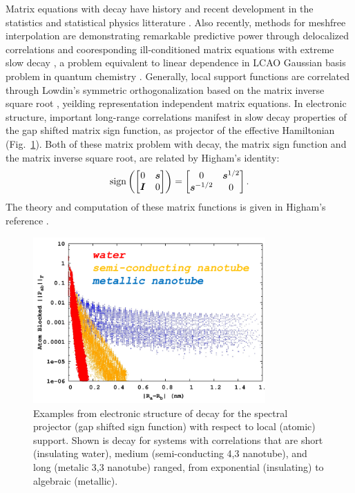 \documentclass[letterpaper,twocolumn,amsmath,amsfont,amssymb,english,aps,jcp,preprintnumbers,groupaddress,nofootinbib,tightenlines,floatfix]{revtex4}
\newcommand{\mat}[1]{\boldsymbol{#1}}
\theoremstyle{plain}
\theoremstyle{remark}
\theoremstyle{plain}
\begin{document}
Matrix equations with decay have history and recent development in the statistics and statistical physics litterature
\cite{penrose1974,voit00, Anselin2003, Hardin2013, Krishtal2014}.   Also recently, methods for meshfree interpolation 
are demonstrating remarkable predictive power through delocalized correlations and cooresponding 
ill-conditioned matrix equations with extreme slow decay \cite{Schaback1995,schaback2006kernel,Fornberg2014}, 
a problem equivalent to linear dependence in LCAO Gaussian basis problem 
in quantum chemistry \cite{Rothlisberger2002,Jansik2007,helgaker2008molecular}.  Generally, local support functions are correlated 
through Lowdin's symmetric orthogonalization based on the matrix inverse square root \cite{Lowdin56}, 
yeilding representation independent matrix equations. 
In electronic structure, important long-range correlations manifest in slow decay properties 
of the gap shifted matrix sign function, as projector of the effective Hamiltonian (Fig.~\ref{figure1}).  
Both of these matrix problem with decay, the matrix sign function and the matrix inverse square root, 
are related by Higham's identity:
\begin{equation}
\rm{sign} \left( \begin{bmatrix} 0 & \mat{s}      \\ \mat{I}       & 0\end{bmatrix} \right)  =
                 \begin{bmatrix} 0 & \mat{s}^{1/2} \\ \mat{s}^{-1/2} & 0\end{bmatrix}  .
\end{equation}
The theory and computation of these matrix functions is given in Higham's reference \cite{Higham08}.

\begin{figure}[h]\label{figure1}
 \includegraphics[width=3.5in]{decay_picture.png}
  \caption{Examples from electronic structure of decay for the
    spectral projector (gap shifted sign function) with respect to
    local (atomic) support.  Shown is decay for systems with
    correlations that are short (insulating water), medium
    (semi-conducting 4,3 nanotube), and long (metalic 3,3 nanotube)
    ranged, from exponential (insulating) to algebraic (metallic). }
\end{figure}
\end{document}
